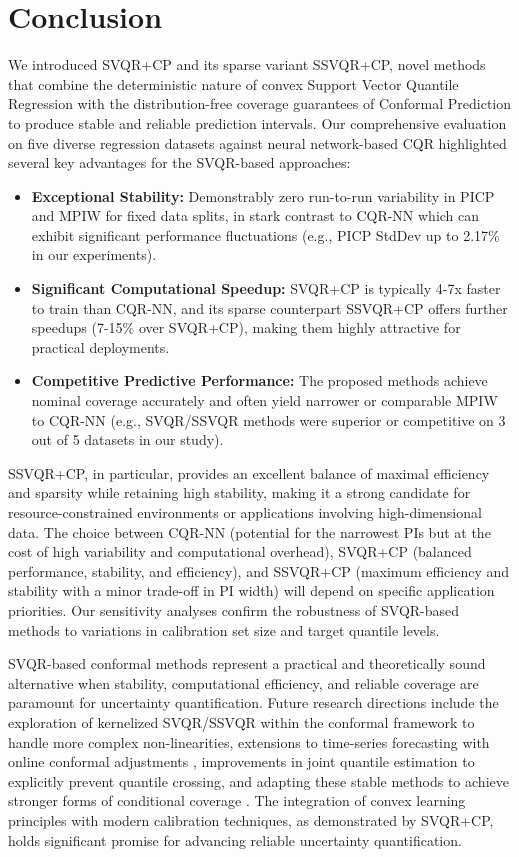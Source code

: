 \documentclass{article}
\begin{document}
\section{Conclusion}
\label{sec:conclusion}
We introduced SVQR+CP and its sparse variant SSVQR+CP, novel methods that combine the deterministic nature of convex Support Vector Quantile Regression with the distribution-free coverage guarantees of Conformal Prediction to produce stable and reliable prediction intervals. Our comprehensive evaluation on five diverse regression datasets against neural network-based CQR highlighted several key advantages for the SVQR-based approaches:
\begin{itemize}[noitemsep, topsep=0pt]
    \item \textbf{Exceptional Stability:} Demonstrably zero run-to-run variability in PICP and MPIW for fixed data splits, in stark contrast to CQR-NN which can exhibit significant performance fluctuations (e.g., PICP StdDev up to 2.17\% in our experiments).
    \item \textbf{Significant Computational Speedup:} SVQR+CP is typically 4-7x faster to train than CQR-NN, and its sparse counterpart SSVQR+CP offers further speedups (7-15\% over SVQR+CP), making them highly attractive for practical deployments.
    \item \textbf{Competitive Predictive Performance:} The proposed methods achieve nominal coverage accurately and often yield narrower or comparable MPIW to CQR-NN (e.g., SVQR/SSVQR methods were superior or competitive on 3 out of 5 datasets in our study).
\end{itemize}

SSVQR+CP, in particular, provides an excellent balance of maximal efficiency and sparsity while retaining high stability, making it a strong candidate for resource-constrained environments or applications involving high-dimensional data. The choice between CQR-NN (potential for the narrowest PIs but at the cost of high variability and computational overhead), SVQR+CP (balanced performance, stability, and efficiency), and SSVQR+CP (maximum efficiency and stability with a minor trade-off in PI width) will depend on specific application priorities. Our sensitivity analyses confirm the robustness of SVQR-based methods to variations in calibration set size and target quantile levels.

SVQR-based conformal methods represent a practical and theoretically sound alternative when stability, computational efficiency, and reliable coverage are paramount for uncertainty quantification. Future research directions include the exploration of kernelized SVQR/SSVQR within the conformal framework to handle more complex non-linearities, extensions to time-series forecasting with online conformal adjustments \citep{Zaffran2022AdaptiveCQ, Gibbs2021OnlineCP}, improvements in joint quantile estimation to explicitly prevent quantile crossing, and adapting these stable methods to achieve stronger forms of conditional coverage \citep{Jung2023ConditionalCP, Cabezas2024EpistemicCP}. The integration of convex learning principles with modern calibration techniques, as demonstrated by SVQR+CP, holds significant promise for advancing reliable uncertainty quantification.
\end{document}
